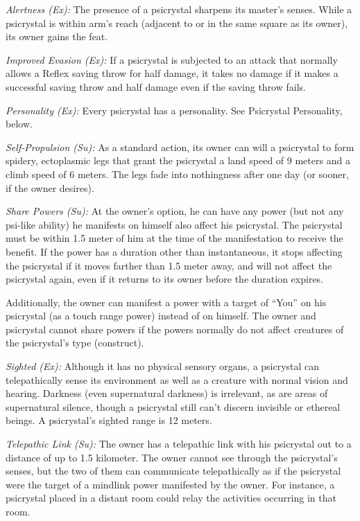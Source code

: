 \textit{Alertness (Ex):} The presence of a psicrystal sharpens its master's senses. While a psicrystal is within arm's reach (adjacent to or in the same square as its owner), its owner gains the  feat.

\textit{Improved Evasion (Ex):} If a psicrystal is subjected to an attack that normally allows a Reflex saving throw for half damage, it takes no damage if it makes a successful saving throw and half damage even if the saving throw fails.

\textit{Personality (Ex):} Every psicrystal has a personality. See Psicrystal Personality, below.

\textit{Self-Propulsion (Su):} As a standard action, its owner can will a psicrystal to form spidery, ectoplasmic legs that grant the psicrystal a land speed of 9 meters and a climb speed of 6 meters. The legs fade into nothingness after one day (or sooner, if the owner desires).

\textit{Share Powers (Su):} At the owner's option, he can have any power (but not any psi-like ability) he manifests on himself also affect his psicrystal. The psicrystal must be within 1.5 meter of him at the time of the manifestation to receive the benefit. If the power has a duration other than instantaneous, it stops affecting the psicrystal if it moves farther than 1.5 meter away, and will not affect the psicrystal again, even if it returns to its owner before the duration expires.

Additionally, the owner can manifest a power with a target of ``You'' on his psicrystal (as a touch range power) instead of on himself. The owner and psicrystal cannot share powers if the powers normally do not affect creatures of the psicrystal's type (construct).

\textit{Sighted (Ex):} Although it has no physical sensory organs, a psicrystal can telepathically sense its environment as well as a creature with normal vision and hearing. Darkness (even supernatural darkness) is irrelevant, as are areas of supernatural silence, though a psicrystal still can't discern invisible or ethereal beings. A psicrystal's sighted range is 12 meters.

\textit{Telepathic Link (Su):} The owner has a telepathic link with his psicrystal out to a distance of up to 1.5 kilometer. The owner cannot see through the psicrystal's senses, but the two of them can communicate telepathically as if the psicrystal were the target of a mindlink power manifested by the owner. For instance, a psicrystal placed in a distant room could relay the activities occurring in that room.

